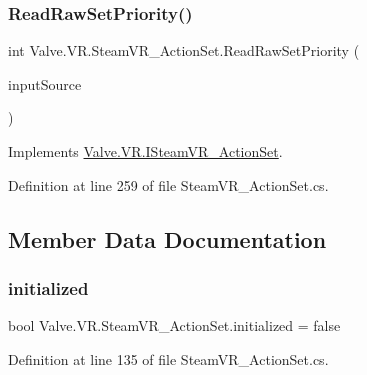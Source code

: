 \mbox{\label{class_valve_1_1_v_r_1_1_steam_v_r___action_set_ab43c42368df77386ea8e480817e814cb}} 
\subsubsection{\texorpdfstring{ReadRawSetPriority()}{ReadRawSetPriority()}}
{\footnotesize\ttfamily int Valve.\+V\+R.\+Steam\+V\+R\+\_\+\+Action\+Set.\+Read\+Raw\+Set\+Priority (\begin{DoxyParamCaption}\item[{\mbox{\hyperlink{namespace_valve_1_1_v_r_a82e5bf501cc3aa155444ee3f0662853f}{Steam\+V\+R\+\_\+\+Input\+\_\+\+Sources}}}]{input\+Source }\end{DoxyParamCaption})}



Implements \mbox{\hyperlink{interface_valve_1_1_v_r_1_1_i_steam_v_r___action_set_a79f6520e36cd4bfa4ddb1388a8ff1b51}{Valve.\+V\+R.\+I\+Steam\+V\+R\+\_\+\+Action\+Set}}.



Definition at line 259 of file Steam\+V\+R\+\_\+\+Action\+Set.\+cs.



\subsection{Member Data Documentation}
\mbox{\label{class_valve_1_1_v_r_1_1_steam_v_r___action_set_a7628464d8dcc5239d10705bd796999d1}} 
\subsubsection{\texorpdfstring{initialized}{initialized}}
{\footnotesize\ttfamily bool Valve.\+V\+R.\+Steam\+V\+R\+\_\+\+Action\+Set.\+initialized = false\hspace{0.3cm}{\ttfamily [protected]}}



Definition at line 135 of file Steam\+V\+R\+\_\+\+Action\+Set.\+cs.

